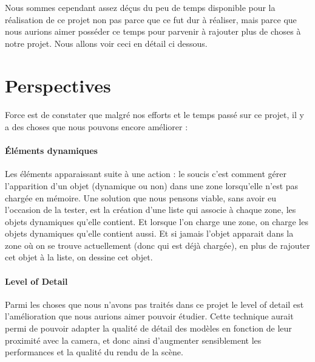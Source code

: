 \documentclass{report}
\begin{document}
		 Nous sommes cependant assez déçus du peu de temps disponible pour la réalisation de ce projet non pas parce que ce fut dur à réaliser, mais parce que nous aurions aimer posséder ce temps pour parvenir à rajouter plus de choses à notre projet. Nous allons voir ceci en détail ci dessous.		
		
\newpage	
		\section{Perspectives}
			\paragraph{}	
				Force est de constater que malgré nos efforts et  le temps passé sur ce projet, il y a des choses que nous pouvons encore améliorer :

\paragraph{Éléments dynamiques} Les éléments apparaissant suite à une action : le soucis c'est comment gérer l'apparition d'un objet (dynamique ou non) dans une zone lorsqu'elle n'est pas chargée en mémoire. Une solution que nous pensons viable, sans avoir eu l'occasion de la tester, est la création d'une liste qui associe à chaque zone, les objets dynamiques qu'elle contient. Et lorsque l'on charge une zone, on charge les objets dynamiques qu'elle contient aussi. Et si jamais l'objet apparait dans la zone où on se trouve actuellement (donc qui est déjà chargée), en plus de rajouter cet objet à la liste, on dessine cet objet.

\paragraph{Level of Detail} Parmi les choses que nous n'avons pas traités dans ce projet le level of detail est l'amélioration que nous aurions aimer pouvoir étudier. Cette technique aurait permi de pouvoir adapter la qualité de détail des modèles en fonction de leur proximité avec la camera, et donc ainsi d'augmenter sensiblement les performances et la qualité du rendu de la scène.
\end{document}
